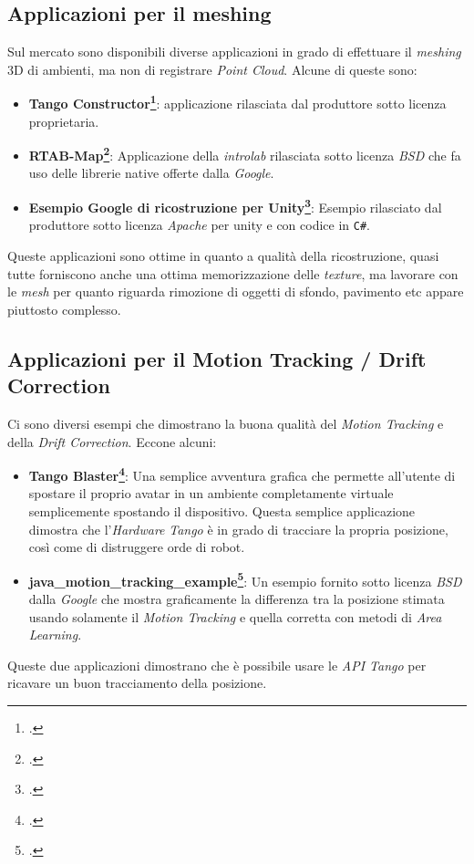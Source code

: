 \subsection{Applicazioni per il meshing}
Sul mercato sono disponibili diverse applicazioni in grado di effettuare il \emph{meshing} 3D di ambienti, ma non di registrare \emph{Point Cloud}. Alcune di queste sono:
\begin{itemize}
	\item \textbf{Tango Constructor\footcite{site: https://developers.google.com/tango/tools/constructor}}: applicazione rilasciata dal produttore sotto licenza proprietaria.
	\item \textbf{RTAB-Map\footcite{site: http://introlab.github.io/rtabmap/}}: Applicazione della \emph{introlab} rilasciata sotto licenza \emph{BSD} che fa uso delle librerie native offerte dalla \emph{Google}.
	\item \textbf{Esempio Google di ricostruzione per Unity\footcite{site: https://github.com/googlesamples/tango-examples-unity}}: Esempio rilasciato dal produttore sotto licenza \emph{Apache} per unity e con codice in \texttt{C\#}.
\end{itemize}
Queste applicazioni sono ottime in quanto a qualità della ricostruzione, quasi tutte forniscono anche una ottima memorizzazione delle \emph{texture}, ma lavorare con le \emph{mesh} per quanto riguarda rimozione di oggetti di sfondo, pavimento etc appare piuttosto complesso.

\subsection{Applicazioni per il Motion Tracking / Drift Correction}
Ci sono diversi esempi che dimostrano la buona qualità del \emph{Motion Tracking} e della \emph{Drift Correction}.
Eccone alcuni:
\begin{itemize}
	\item \textbf{Tango Blaster\footcite{site: https://play.google.com/store/apps/details?id=com.projecttango.tangoblaster}}: Una semplice avventura grafica che permette all'utente di spostare il proprio avatar in un ambiente completamente virtuale semplicemente spostando il dispositivo. Questa semplice applicazione dimostra che l'\emph{Hardware} \emph{Tango} è in grado di tracciare la propria posizione, così come di distruggere orde di robot.
	\item \textbf{java\_motion\_tracking\_example\footcite{site: https://github.com/googlesamples/tango-examples-java/tree/master}}: Un esempio fornito sotto licenza \emph{BSD} dalla \emph{Google} che mostra graficamente la differenza tra la posizione stimata usando solamente il \emph{Motion Tracking} e quella corretta con metodi di \emph{Area Learning}.
\end{itemize}
Queste due applicazioni dimostrano che è possibile usare le \emph{API Tango} per ricavare un buon tracciamento della posizione.


